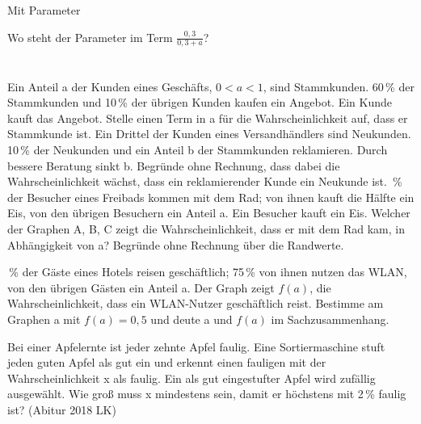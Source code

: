 \setcounter{aufgabe}{11}

\begin{aufgabe}{Mit Parameter}
\begin{teile}
\teil Wo steht der Parameter im Term $\frac{0{,}3}{0{,}3 + a}$? \\  \\  \\ 
\teil Ein Anteil a der Kunden eines Geschäfts, $0 < a < 1$, sind Stammkunden. 60\,\% der Stammkunden und 10\,\% der übrigen Kunden kaufen ein Angebot. Ein Kunde kauft das Angebot. Stelle einen Term in a für die Wahrscheinlichkeit auf, dass er Stammkunde ist. \leerfeld
\teil Ein Drittel der Kunden eines Versandhändlers sind Neukunden. 10\,\% der Neukunden und ein Anteil b der Stammkunden reklamieren. Durch bessere Beratung sinkt b. Begründe ohne Rechnung, dass dabei die Wahrscheinlichkeit wächst, dass ein reklamierender Kunde ein Neukunde ist.
\,\% der Besucher eines Freibads kommen mit dem Rad; von ihnen kauft die Hälfte ein Eis, von den übrigen Besuchern ein Anteil a. Ein Besucher kauft ein Eis. Welcher der Graphen A, B, C zeigt die Wahrscheinlichkeit, dass er mit dem Rad kam, in Abhängigkeit von a? Begründe ohne Rechnung über die Randwerte.

\begin{ksys}[xmin=0,xmax=1,ymin=0,ymax=1,xstep=0.2,ystep=0.2,ablesen]    \end{ksys}
\,\% der Gäste eines Hotels reisen geschäftlich; 75\,\% von ihnen nutzen das WLAN, von den übrigen Gästen ein Anteil a. Der Graph zeigt $f(a)$, die Wahrscheinlichkeit, dass ein WLAN-Nutzer geschäftlich reist. Bestimme am Graphen a mit $f(a) = 0{,}5$ und deute a und $f(a)$ im Sachzusammenhang.

\begin{ksys}[xmin=0,xmax=1,ymin=0,ymax=1,xstep=0.1,ystep=0.1,ablesen]  \end{ksys}
\teil Bei einer Apfelernte ist jeder zehnte Apfel faulig. Eine Sortiermaschine stuft jeden guten Apfel als gut ein und erkennt einen fauligen mit der Wahrscheinlichkeit x als faulig. Ein als gut eingestufter Apfel wird zufällig ausgewählt. Wie groß muss x mindestens sein, damit er höchstens mit 2\,\% faulig ist? \hfill (Abitur 2018 LK)
\end{teile}
\end{aufgabe}

